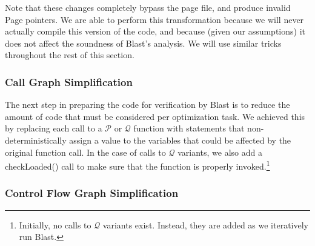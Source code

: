 \documentclass[10pt,letterpaper,twocolumn,english]{article}
\newcommand{\checkpage}{checkLoaded()\xspace}
\newcommand{\fP}{{$\mathcal P$}\xspace}
\newcommand{\fQ}{{$\mathcal Q$}\xspace}
\begin{document}
Note that these changes completely bypass the page file, and produce invalid Page pointers.
We are able to perform this transformation because we will never
actually compile this version of the code, and because (given our
assumptions) it does not affect the soundness of Blast's analysis.  We
will use similar tricks throughout the rest of this section.

\subsubsection{Call Graph Simplification}

The next step in preparing the code for verification by Blast is to
reduce the amount of code that must be considered per optimization task.
We achieved this by replacing each call to a \fP or \fQ function with
statements that non-deterministically assign a value to the variables
that could be affected by the original function call.  In the case of
calls to \fQ variants, we also add a \checkpage call to make sure that
the function is properly invoked.\footnote{Initially, no calls to \fQ
variants exist.  Instead, they are added as we iteratively run Blast.}

\subsubsection{Control Flow Graph Simplification}
\label{cfgs}
\end{document}

